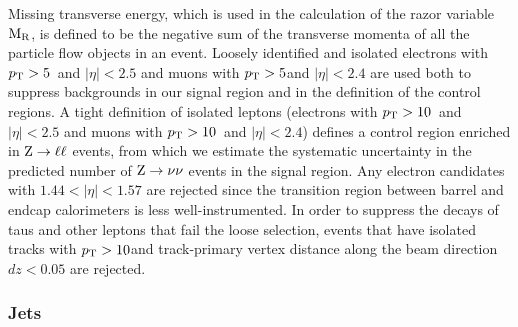 Missing transverse energy, which is used in the calculation of the razor variable $\mathrm{M_R}$, is 
defined to be the negative sum of the transverse momenta of all the particle flow objects in an
event.  Loosely identified and isolated electrons with $p_{\mathrm{T}} > 5$~\GeV and $|\eta| < 2.5$ and muons
with $p_{\mathrm{T}} > 5$\GeV and $|\eta| < 2.4$ are used both to suppress backgrounds in our signal region and
in the definition of the control regions.  A tight definition of isolated leptons (electrons with
$p_{\mathrm{T}} > 10$~\GeV and $|\eta| < 2.5$ and muons with $p_{\mathrm{T}} > 10$~\GeV and $|\eta| < 2.4$) defines a
control region enriched in $\mathrm{Z} \rightarrow \ell \ell $ events, from which we estimate the
systematic uncertainty in the predicted number of $\mathrm{Z} \rightarrow \nu \nu$ events in the signal
region. Any electron candidates with $1.44 < |\eta| < 1.57$ are rejected since the transition region
between barrel and endcap calorimeters is less well-instrumented.
In order to suppress the decays of taus and other leptons that fail the loose selection, events that
have isolated tracks with $p_{\mathrm{T}} > 10$\GeV and track-primary vertex distance along the beam direction
$dz < 0.05$ are rejected.

\subsubsection{Jets \label{sec:object_jets}}
